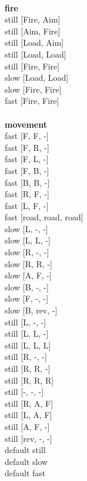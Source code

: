 \ \\ {\bf fire } \\
still [Fire, Aim] \\
still [Aim, Fire] \\
still [Load, Aim] \\
still [Load, Load] \\
still [Fire, Fire] \\
slow [Load, Load] \\
slow [Fire, Fire] \\
fast [Fire, Fire] \\
\ \\ {\bf movement } \\
fast [F, F, -] \\
fast [F, R, -] \\
fast [F, L, -] \\
fast [F, B, -] \\
fast [B, B, -] \\
fast [R, F, -] \\
fast [L, F, -] \\
fast [road, road, road] \\
slow [L, -, -] \\
slow [L, L, -] \\
slow [R, -, -] \\
slow [R, R, -] \\
slow [A, F, -] \\
slow [B, -, -] \\
slow [F, -, -] \\
slow [B, rev, -] \\
still [L, -, -] \\
still [L, L, -] \\
still [L, L, L] \\
still [R, -, -] \\
still [R, R, -] \\
still [R, R, R] \\
still [-, -, -] \\
still [R, A, F] \\
still [L, A, F] \\
still [A, F, -] \\
still [rev, -, -] \\
default still \\
default slow \\
default fast \\



